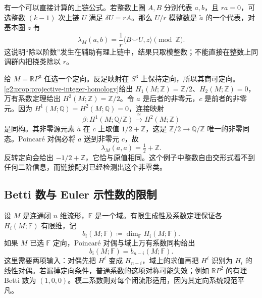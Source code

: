 有一个可以直接计算的上链公式。若整数上圈 \(A,B\) 分别代表 \(a,b\)，且 \(ra=0\)，可选整数 \((k-1)\) 次上链 \(U\) 满足 \(\delta U=rA\)。那么 \(U/r\) 模整数是 \(\widetilde a\) 的一个代表，对基本圈 \(z\) 有
\begin{equation}\label{g2:eq:linking-fractional-cochain}
	\lambda_M(a,b)=\frac1r\langle B\smile U,z\rangle\pmod{\mathbb Z}.
\end{equation}
这说明“除以阶数”发生在辅助有理上链中，结果只取模整数；不能直接在整数上同调群内把挠类除以 \(r\)。

\begin{example}\label{g2:exm:rp3-linking}
	给 \(M=\mathbb RP^3\) 任选一个定向。反足映射在 \(S^3\) 上保持定向，所以其商可定向。\cref{g2:prop:projective-integer-homology}给出 \(H_1(M;\mathbb Z)=\mathbb Z/2\)、\(H_2(M;\mathbb Z)=0\)，万有系数定理给出 \(H^2(M;\mathbb Z)=\mathbb Z/2\)。令 \(a\) 是后者的非零元，\(c\) 是前者的非零元。因为 \(H^1(M;\mathbb Q)=H^2(M;\mathbb Q)=0\)，连接映射
	\[
		\beta:H^1(M;\mathbb Q/\mathbb Z)\xrightarrow{\ \cong\ }H^2(M;\mathbb Z)
	\]
	是同构。其非零源元素 \(\widetilde a\) 在 \(c\) 上取值 \(1/2+\mathbb Z\)，这是 \(\mathbb Z/2\to\mathbb Q/\mathbb Z\) 唯一的非零同态。Poincaré 对偶必将 \(a\) 送到非零元 \(c\)，故
	\[
		\lambda_M(a,a)=\tfrac12+\mathbb Z.
	\]
	反转定向会给出 \(-1/2+\mathbb Z\)，它恰与原值相同。这个例子中整数自由交形式看不到任何二阶信息，而链接配对已经检测出这个非零类。
\end{example}

\subsection{Betti 数与 Euler 示性数的限制}
\label{g2:subsec:0605:04}
设 \(M\) 是连通闭 \(n\) 维流形，\(\mathbb F\) 是一个域。有限生成性及系数定理保证各 \(H_i(M;\mathbb F)\) 有限维，记
\[
	 b_i(M;\mathbb F)\coloneqq\dim_{\mathbb F}H_i(M;\mathbb F).
\]
如果 \(M\) 已选 \(\mathbb F\) 定向，Poincaré 对偶与域上万有系数同构给出
\begin{equation}\label{g2:eq:betti-duality}
	 b_i(M;\mathbb F)=b_{n-i}(M;\mathbb F).
\end{equation}
这里需要两项输入：对偶先把 \(H^i\) 变成 \(H_{n-i}\)，域上的求值再把 \(H^i\) 识别为 \(H_i\) 的线性对偶。若漏掉定向条件，普通系数的这项对称可能失效；例如 \(\mathbb RP^2\) 的有理 Betti 数为 \((1,0,0)\)。模二系数则对每个闭流形适用，因为其定向系统规范平凡。

